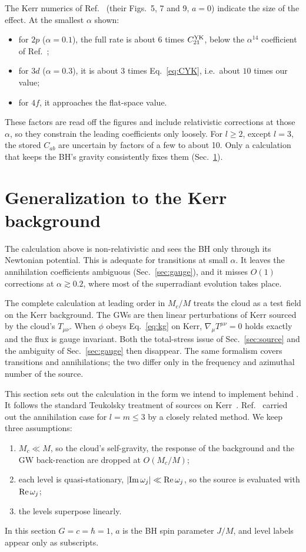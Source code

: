\documentclass[11pt]{article}
\newcommand{\code}[1]{\path{#1}}
\begin{document}
The Kerr numerics of Ref.~\cite{YK14} (their Figs.~5, 7 and 9, $a=0$) indicate the size of the effect. At the smallest $\alpha$ shown:
\begin{itemize}
\item for $2p$ ($\alpha=0.1$), the full rate is about $6$ times $C^{\rm YK}_{21}$, below the $\alpha^{14}$ coefficient of Ref.~\cite{Brito17};
\item for $3d$ ($\alpha=0.3$), it is about $3$ times Eq.~\eqref{eq:CYK}, i.e.\ about $10$ times our value;
\item for $4f$, it approaches the flat-space value.
\end{itemize}
These factors are read off the figures and include relativistic corrections at those $\alpha$, so they constrain the leading coefficients only loosely. For $l\ge2$, except $l=3$, the stored $C_{ab}$ are uncertain by factors of a few to about 10. Only a calculation that keeps the BH's gravity consistently fixes them (Sec.~\ref{sec:kerr}).

\section{Generalization to the Kerr background}
\label{sec:kerr}

The calculation above is non-relativistic and sees the BH only through its Newtonian potential. This is adequate for transitions at small $\alpha$. It leaves the annihilation coefficients ambiguous (Sec.~\ref{sec:gauge}), and it misses $O(1)$ corrections at $\alpha\gtrsim0.2$, where most of the superradiant evolution takes place.

The complete calculation at leading order in $M_c/M$ treats the cloud as a test field on the Kerr background. The GWs are then linear perturbations of Kerr sourced by the cloud's $T_{\mu\nu}$. When $\phi$ obeys Eq.~\eqref{eq:kg} on Kerr, $\nabla_\mu T^{\mu\nu}=0$ holds exactly and the flux is gauge invariant. Both the total-stress issue of Sec.~\ref{sec:source} and the ambiguity of Sec.~\ref{sec:gauge} then disappear. The same formalism covers transitions and annihilations; the two differ only in the frequency and azimuthal number of the source.

This section sets out the calculation in the form we intend to implement behind \code{gw_rates_relativistic}. It follows the standard Teukolsky treatment of sources on Kerr~\cite{Teukolsky73,TP74,Hughes00,ST03}. Ref.~\cite{YK14} carried out the annihilation case for $l=m\le3$ by a closely related method. We keep three assumptions:
\begin{enumerate}
\item $M_c\ll M$, so the cloud's self-gravity, the response of the background and the GW back-reaction are dropped at $O(M_c/M)$;
\item each level is quasi-stationary, $|{\rm Im}\,\omega_j|\ll{\rm Re}\,\omega_j$, so the source is evaluated with ${\rm Re}\,\omega_j$;
\item the levels superpose linearly.
\end{enumerate}
In this section $G=c=\hbar=1$, $a$ is the BH spin parameter $J/M$, and level labels appear only as subscripts.
\end{document}
